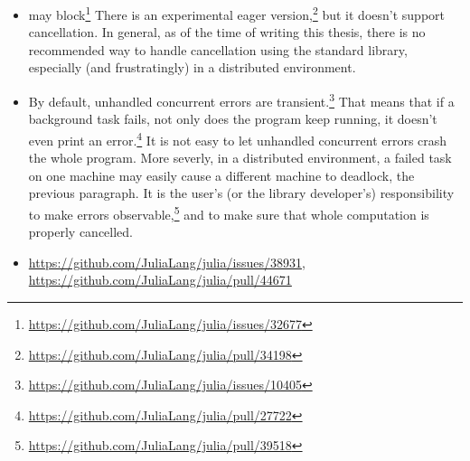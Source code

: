 \begin{itemize}
  \item
     may block\footnote{\url{https://github.com/JuliaLang/julia/issues/32677}}
    There is an experimental eager version,\footnote{\url{https://github.com/JuliaLang/julia/pull/34198}} but it doesn't support cancellation.
    In general, as of the time of writing this thesis,
    there is no recommended way to handle cancellation using the standard library,
    especially (and frustratingly) in a distributed environment.
  \item
    By default, unhandled concurrent errors are transient.\footnote{%
      \url{https://github.com/JuliaLang/julia/issues/10405}}
    That means that if a background task fails, not only does the program keep running, it doesn't even print an error.\footnote{%
      \url{https://github.com/JuliaLang/julia/pull/27722}}
    It is not easy to let unhandled concurrent errors crash the whole program.
    More severly, in a distributed environment, a failed task on one machine may easily cause a different machine to deadlock,
    \cf the previous paragraph.
    It is the user's (or the library developer's) responsibility to make errors observable,\footnote{%
      \url{https://github.com/JuliaLang/julia/pull/39518}}
    and to make sure that whole computation is properly cancelled.
  \item
    \url{https://github.com/JuliaLang/julia/issues/38931},
    \url{https://github.com/JuliaLang/julia/pull/44671}
\end{itemize}

